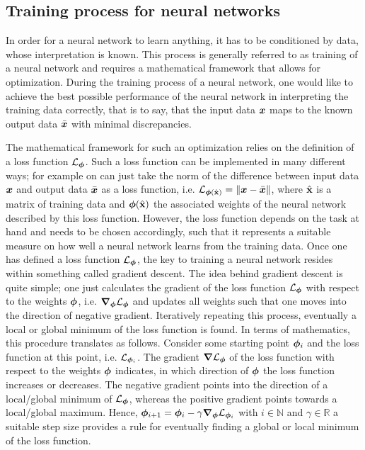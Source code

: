 \documentclass[a4paper,12pt]{report}
\begin{document}
\subsection{Training process for neural networks}
In order for a neural network to learn anything, it has to be conditioned by data, whose interpretation is known. This process is generally referred to as training of a neural network and requires a mathematical framework that allows for optimization. During the training process of a neural network, one would like to achieve the best possible performance of the neural network in interpreting the training data correctly, that is to say, that the input data $\bm{x}$ maps to the known output data $\bar{\bm{x}}$ with minimal discrepancies.

The mathematical framework for such an optimization relies on the definition of a loss function $\mathcal{L}_{\bm{\phi}}$. Such a loss function can be implemented in many different ways; for example on can just take the norm of the difference between input data $\bm{x}$ and output data $\bar{\bm{x}}$ as a loss function, i.e. $\mathcal{L}_{\bm{\phi}(\hat{\boldsymbol{\mathbf{x}}})} = \|\bm{x}-\bar{\bm{x}}\|$, where $\hat{\boldsymbol{\mathbf{x}}}$ is a matrix of training data and $\bm{\phi}(\hat{\boldsymbol{\mathbf{x}}})$ the associated weights of the neural network described by this loss function. However, the loss function depends on the task at hand and needs to be chosen accordingly, such that it represents a suitable measure on how well a neural network learns from the training data. Once one has defined a loss function $\mathcal{L}_{\bm{\phi}}$, the key to training a neural network resides within something called gradient descent. The idea behind gradient descent is quite simple; one just calculates the gradient of the loss function $\mathcal{L}_{\bm{\phi}}$ with respect to the weights $\bm{\phi}$, i.e. $\bm{\nabla}_{\bm{\phi}}\mathcal{L}_{\bm{\phi}}$ and updates all weights such that one moves into the direction of negative gradient. Iteratively repeating this process, eventually a local or global minimum of the loss function is found. In terms of mathematics, this procedure translates as follows. Consider some starting point $\bm{\phi}_i$ and the loss function at this point, i.e. $\mathcal{L}_{\bm{\phi}_i}$. The gradient $\bm{\nabla}\mathcal{L}_{\bm{\phi}}$ of the loss function with respect to the weights $\bm{\phi}$ indicates, in which direction of $\bm{\phi}$ the loss function increases or decreases. The negative gradient points into the direction of a local/global minimum of $\mathcal{L}_{\bm{\phi}}$, whereas the positive gradient points towards a local/global maximum. Hence, $\bm{\phi}_{i+1} = \bm{\phi}_{i} - \gamma \bm{\nabla}_{\bm{\phi}}\mathcal{L}_{\bm{\phi}_i}$ with $i \in \mathbb{N}$ and $\gamma \in \mathbb{R}$ a suitable step size provides a rule for eventually finding a global or local minimum of the loss function. 
\end{document}
